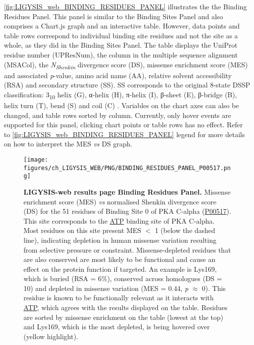 \autoref{fig:LIGYSIS_web_BINDING_RESIDUES_PANEL} illustrates the the Binding Residues Panel. This panel is similar to the Binding Sites Panel and also comprises a Chart.js graph and an interactive table. However, data points and table rows correspond to individual binding site residues and not the site as a whole, as they did in the Binding Sites Panel. The table displays the UniProt residue number (UPResNum), the column in the multiple sequence alignment (MSACol), the \textit{N\textsubscript{Shenkin}} divergence score (DS), missense enrichment score (MES) and associated \textit{p}-value, amino acid name (AA), relative solvent accessibility (RSA) and secondary structure (SS). SS corresponds to the original 8-state DSSP classification: 3\textsubscript{10} helix (G), α-helix (H), π-helix (I), β-sheet (E), β-bridge (B), helix turn (T), bend (S) and coil (C) \cite{KABSCH_1983_DSSP}. Variables on the chart axes can also be changed, and table rows sorted by column. Currently, only hover events are supported for this panel, clicking chart points or table rows has no effect. Refer to \autoref{fig:LIGYSIS_web_BINDING_RESIDUES_PANEL} legend for more details on how to interpret the MES \textit{vs} DS graph.

\begin{figure}[htb!]
    \centering
    \texttt{[image: figures/ch\_LIGYSIS\_WEB/PNG/BINDING\_RESIDUES\_PANEL\_P00517.png]}
    \caption[LIGYSIS-web results page Binding Residues Panel]{\textbf{LIGYSIS-web results page Binding Residues Panel.} Missense enrichment score (MES) \textit{vs} normalised Shenkin divergence score (DS) for the 51 residues of Binding Site 0 of PKA C-alpha (\href{https://www.uniprot.org/uniprotkb/P00517/entry}{P00517}). This site corresponds to the \href{https://www.ebi.ac.uk/pdbe-srv/pdbechem/chemicalCompound/show/ATP}{ATP} binding site of PKA C-alpha. Most residues on this site present MES $<$ 1 (below the dashed line), indicating depletion in human missense variation resulting from selective pressure or constraint. Missense-depleted residues that are also conserved are most likely to be functional and cause an effect on the protein function if targeted. An example is Lys169, which is buried (RSA = 6\%), conserved across homologues (DS = 10) and depleted in missense variation (MES = 0.44, \textit{p} $\approx$ 0). This residue is known to be functionally relevant as it interacts with \href{https://www.ebi.ac.uk/pdbe-srv/pdbechem/chemicalCompound/show/ATP}{ATP}, which agrees with the results displayed on the table. Residues are sorted by missense enrichment on the table (lowest at the top) and Lys169, which is the most depleted, is being hovered over (yellow highlight).}
    \label{fig:LIGYSIS_web_BINDING_RESIDUES_PANEL}
\end{figure}

